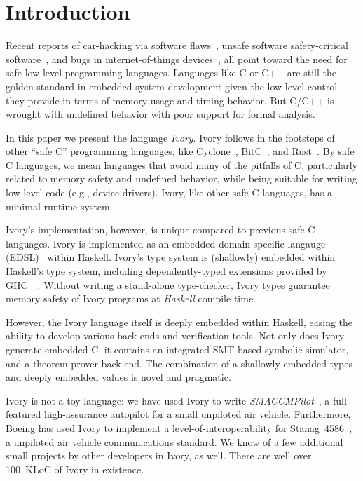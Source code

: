 \section{Introduction}
\label{sec:introduction}

Recent reports of car-hacking via software flaws~\cite{}, unsafe software
safety-critical software~\cite{}, and bugs in internet-of-things
devices~\cite{}, all point toward the need for safe low-level programming
languages. Languages like C or C++ are still the golden standard in embedded
system development given the low-level control they provide in terms of memory
usage and timing behavior. But C/C++ is wrought with undefined behavior with
poor support for formal analysis.

In this paper we present the language \emph{Ivory}.  Ivory follows in the
footsteps of other ``safe C'' programming languages, like
Cyclone~\cite{cyclone}, BitC~\cite{bitc}, and Rust~\cite{rust}. By safe C
languages, we mean languages that avoid many of the pitfalls of C, particularly
related to memory safety and undefined behavior, while being suitable for
writing low-level code (e.g., device drivers). Ivory, like other safe C
languages, has a minimal runtime system.

Ivory's implementation, however, is unique compared to previous safe C
languages. Ivory is implemented as an embedded domain-specific langauge
(EDSL)~\cite{edsl} within Haskell. Ivory's type system is (shallowly) embedded
within Haskell's type system, including dependently-typed extensions provided by
GHC~~\cite{dephaskell}. Without writing a stand-alone type-checker, Ivory types
guarantee memory safety of Ivory programs at \emph{Haskell} compile time.

However, the Ivory language itself is deeply embedded within Haskell, easing the
ability to develop various back-ends and verification tools. Not only does Ivory
generate embedded C, it contains an integrated SMT-based symbolic simulator, and
a theorem-prover back-end. The combination of a shallowly-embedded types and
deeply embedded values is novel and pragmatic.

Ivory is not a toy language: we have used Ivory to write
\emph{SMACCMPilot}~\cite{smaccm}, a full-featured high-assurance
autopilot for a small unpiloted air vehicle.  Furthermore, Boeing has
used Ivory to implement a level-of-interoperability for
Stanag~4586~\cite{stanag}, a unpiloted air vehicle communications
standard. We know of a few additional small projects by other
developers in Ivory, as well.  There are well over 100~KLoC of Ivory in existence.


